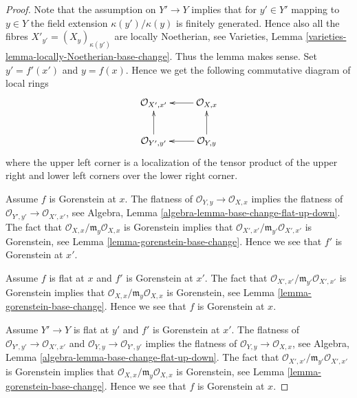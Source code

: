 \documentclass[10pt,a4paper]{amsart}
\theoremstyle{plain}
\theoremstyle{definition}
\theoremstyle{remark}
\numberwithin{equation}{subsection}
\begin{document}
\begin{proof}
Note that the assumption on $Y' \to Y$ implies that for $y' \in Y'$
mapping to $y \in Y$ the field extension $\kappa(y')/\kappa(y)$
is finitely generated. Hence also all the fibres
$X'_{y'} = (X_y)_{\kappa(y')}$ are locally Noetherian, see
Varieties, Lemma \ref{varieties-lemma-locally-Noetherian-base-change}.
Thus the lemma makes sense. Set $y' = f'(x')$ and $y = f(x)$.
Hence we get the following commutative diagram of local rings
$$
\xymatrix{
\mathcal{O}_{X', x'} & \mathcal{O}_{X, x} \ar[l] \\
\mathcal{O}_{Y', y'} \ar[u] & \mathcal{O}_{Y, y} \ar[l] \ar[u]
}
$$
where the upper left corner is a localization of the tensor product
of the upper right and lower left corners over the lower right corner.

\medskip\noindent
Assume $f$ is Gorenstein at $x$.
The flatness of $\mathcal{O}_{Y, y} \to \mathcal{O}_{X, x}$
implies the flatness of $\mathcal{O}_{Y', y'} \to \mathcal{O}_{X', x'}$, see
Algebra, Lemma \ref{algebra-lemma-base-change-flat-up-down}.
The fact that $\mathcal{O}_{X, x}/\mathfrak m_y\mathcal{O}_{X, x}$
is Gorenstein implies that
$\mathcal{O}_{X', x'}/\mathfrak m_{y'}\mathcal{O}_{X', x'}$
is Gorenstein, see
Lemma \ref{lemma-gorenstein-base-change}. Hence we see that $f'$
is Gorenstein at $x'$.

\medskip\noindent
Assume $f$ is flat at $x$ and $f'$ is Gorenstein at $x'$.
The fact that $\mathcal{O}_{X', x'}/\mathfrak m_{y'}\mathcal{O}_{X', x'}$
is Gorenstein implies that
$\mathcal{O}_{X, x}/\mathfrak m_y\mathcal{O}_{X, x}$
is Gorenstein, see
Lemma \ref{lemma-gorenstein-base-change}. Hence we see that $f$
is Gorenstein at $x$.

\medskip\noindent
Assume $Y' \to Y$ is flat at $y'$ and $f'$ is Gorenstein at
$x'$. The flatness of $\mathcal{O}_{Y', y'} \to \mathcal{O}_{X', x'}$
and $\mathcal{O}_{Y, y} \to \mathcal{O}_{Y', y'}$ implies the flatness
of $\mathcal{O}_{Y, y} \to \mathcal{O}_{X, x}$, see
Algebra, Lemma \ref{algebra-lemma-base-change-flat-up-down}.
The fact that $\mathcal{O}_{X', x'}/\mathfrak m_{y'}\mathcal{O}_{X', x'}$
is Gorenstein implies that
$\mathcal{O}_{X, x}/\mathfrak m_y\mathcal{O}_{X, x}$
is Gorenstein, see
Lemma \ref{lemma-gorenstein-base-change}. Hence we see that $f$
is Gorenstein at $x$.
\end{proof}
\end{document}
